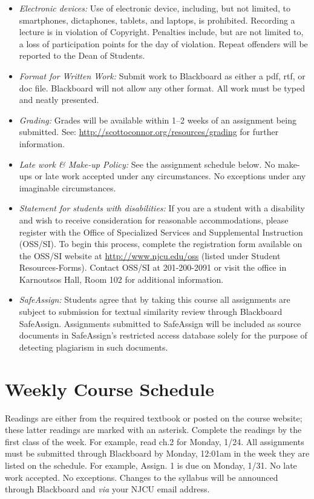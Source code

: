 \documentclass[article,oneside]{memoir}
\begin{document}
\begin{itemize}
\item \textit{Electronic devices:} Use of electronic device, including, but not limited, to smartphones, dictaphones, tablets, and laptops, is prohibited. Recording a lecture is in violation of Copyright. Penalties include, but are not limited to, a loss of participation points for the day of violation. Repeat offenders will be reported to the Dean of Students.

\item \textit{Format for Written Work:} Submit work to Blackboard as either a pdf, rtf, or doc file. Blackboard will not allow any other format. All work must be typed and neatly presented. 


\item \textit{Grading:} Grades will be available within 1--2 weeks of an assignment being submitted. See: \href{http://scottoconnor.org/resources/grading}{http://scottoconnor.org/resources/grading} for further information.


\item \textit{Late work \& Make-up Policy:} See the assignment schedule below. No make-ups or late work accepted under any circumstances. No exceptions under any imaginable circumstances.

\item \textit{Statement for students with disabilities:} If you are a student
with a disability and wish to receive consideration for reasonable
accommodations, please register with the Office of Specialized Services
and Supplemental Instruction (OSS/SI). To begin this process, complete
the registration form available on the OSS/SI website at
\href{http://www.njcu.edu/oss}{http://www.njcu.edu/oss}
(listed under Student Resources-Forms). Contact OSS/SI at 201-200-2091
or visit the office in Karnoutsos Hall, Room 102 for additional
information.
 

\item \textit{SafeAssign:} Students agree that by taking this course all assignments are subject to submission for textual similarity review through Blackboard SafeAssign. Assignments submitted to SafeAssign will be included as source documents in SafeAssign's restricted access database solely for the purpose of detecting plagiarism in such documents.  


\end{itemize}




\section{Weekly Course Schedule}
Readings are either from the required textbook or posted on the course website; these latter readings are marked with an asterisk. Complete the readings by the first class of the week. For example, read ch.2 for Monday, 1/24. All assignments must be submitted through Blackboard by Monday, 12:01am in the week they are listed on the schedule. For example, Assign. 1 is due on Monday, 1/31. No late work accepted. No exceptions.  
Changes to the syllabus will be announced through Blackboard and \emph{via} your NJCU email address.  
\end{document}
